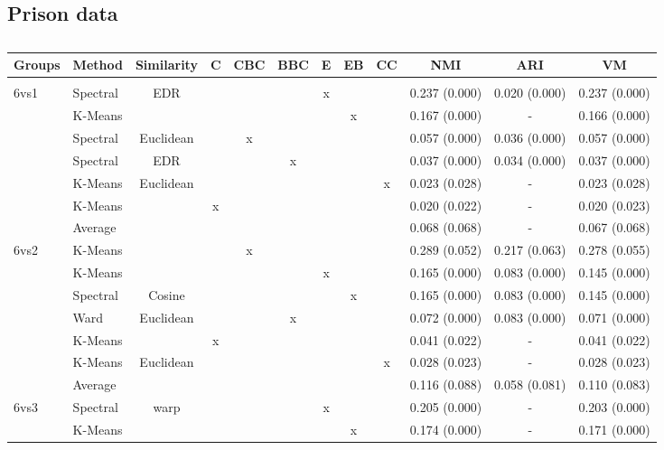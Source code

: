 \documentclass[12pt,a4paper,bibliography=totocnumbered,listof=totocnumbered]{scrartcl}
\begin{document}
{\begin{appendix}
\pagebreak
\subsection{Prison data}

\begin{table}[!htbp] \centering 
	\caption{} 
	\label{} 
	\scriptsize 
	\begin{tabular}{@{\extracolsep{0pt}} llcccccccccc} 
		\toprule
		Groups & Method & Similarity & C & CBC & BBC & E & EB & CC & NMI & ARI & VM \\ 
		\hline \\[-1.8ex] 
		6vs1 & Spectral & EDR &  &  &  & x &  &  & 0.237 (0.000) & 0.020 (0.000) & 0.237 (0.000) \\ 
		& K-Means &  &  &  &  &  & x &  & 0.167 (0.000) & - & 0.166 (0.000) \\ 
		& Spectral & Euclidean &  & x &  &  &  &  & 0.057 (0.000) & 0.036 (0.000) & 0.057 (0.000) \\ 
		& Spectral & EDR &  &  & x &  &  &  & 0.037 (0.000) & 0.034 (0.000) & 0.037 (0.000) \\ 
		& K-Means & Euclidean &  &  &  &  &  & x & 0.023 (0.028) & - & 0.023 (0.028) \\ 
		& K-Means &  & x &  &  &  &  &  & 0.020 (0.022) & - & 0.020 (0.023) \\ 
		& Average &  &  &  &  &  &  &  & 0.068 (0.068) & - & 0.067 (0.068) \\ 
		6vs2 & K-Means &  &  & x &  &  &  &  & 0.289 (0.052) & 0.217 (0.063) & 0.278 (0.055) \\ 
		& K-Means &  &  &  &  & x &  &  & 0.165 (0.000) & 0.083 (0.000) & 0.145 (0.000) \\ 
		& Spectral & Cosine &  &  &  &  & x &  & 0.165 (0.000) & 0.083 (0.000) & 0.145 (0.000) \\ 
		& Ward & Euclidean &  &  & x &  &  &  & 0.072 (0.000) & 0.083 (0.000) & 0.071 (0.000) \\ 
		& K-Means &  & x &  &  &  &  &  & 0.041 (0.022) & - & 0.041 (0.022) \\ 
		& K-Means & Euclidean &  &  &  &  &  & x & 0.028 (0.023) & - & 0.028 (0.023) \\ 
		& Average &  &  &  &  &  &  &  & 0.116 (0.088) & 0.058 (0.081) & 0.110 (0.083) \\ 
		6vs3 & Spectral & warp &  &  &  & x &  &  & 0.205 (0.000) & - & 0.203 (0.000) \\ 
		& K-Means &  &  &  &  &  & x &  & 0.174 (0.000) & - & 0.171 (0.000) \\ 

\end{tabular}
\end{table}
\end{appendix}}
\end{document}
